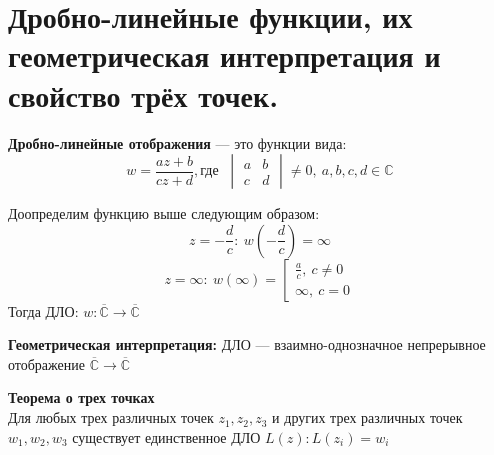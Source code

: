 \newpage
\section{Дробно-линейные функции, их геометрическая интерпретация и свойство трёх точек.}

\textbf{Дробно-линейные отображения} --- это функции вида: $$w=\frac{az+b}{cz+d}, \text{где } \ \begin{vmatrix}
    a&b\\
    c&d
\end{vmatrix} \neq 0, \ a,b,c,d\in \mathbb{C}$$

Доопределим функцию выше следующим образом:$$z=-\frac{d}{c}: \ w(-\frac{d}{c}) = \infty$$
$$z = \infty: \ w(\infty) = \left[\begin{gathered}\frac{a}{c}, \ c\neq 0\\
\infty, \ c=0
\end{gathered}
\right.$$
Тогда ДЛО: $w: \overline{\mathbb{C}}\to \overline{\mathbb{C}}$


\textbf{Геометрическая интерпретация:}
ДЛО --- взаимно-однозначное непрерывное отображение $\overline{\mathbb{C}}\to \overline{\mathbb{C}}$

\textbf{Теорема о трех точках} \\
Для любых трех различных точек $z_1, z_2, z_3$ и других трех различных точек $w_1, w_2, w_3$ 
существует единственное ДЛО $L(z): L(z_i) = w_i$

